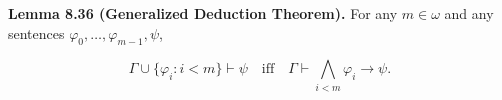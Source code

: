 \textbf{Lemma 8.36 (Generalized Deduction Theorem).} For any $m \in \omega$ and any sentences $\varphi_0, \ldots, \varphi_{m-1}, \psi$,

$$\Gamma \cup \{\varphi_i : i < m\} \vdash \psi \quad \text{iff} \quad \Gamma \vdash \bigwedge_{i < m} \varphi_i \rightarrow \psi.$$

